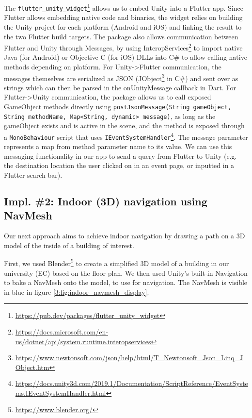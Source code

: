             The \texttt{flutter_unity_widget}\footnote{\url{https://pub.dev/packages/flutter_unity_widget}} allows us to embed Unity into a Flutter app. Since Flutter allows embedding native code and binaries, the widget relies on building the Unity project for each platform (Android and iOS) and linking the result to the two Flutter build targets.
            The package also allows communication between Flutter and Unity through Messages, by using InteropServices\footnote{\url{https://docs.microsoft.com/en-us/dotnet/api/system.runtime.interopservices}} to import native Java (for Android) or Objective-C (for iOS) DLLs into C# to allow calling native methods depending on platform. For Unity->Flutter communication, the messages themselves are serialized as JSON (JObject\footnote{\url{https://www.newtonsoft.com/json/help/html/T_Newtonsoft_Json_Linq_JObject.htm}} in C\#) and sent over as strings which can then be parsed in the onUnityMessage callback in Dart. For Flutter->Unity communication, the package allows us to call exposed GameObject methods directly using \texttt{postJsonMessage(String gameObject, String methodName, Map<String, dynamic> message)}, as long as the gameObject exists and is active in the scene, and the method is exposed through a \texttt{MonoBehaviour} script that uses \texttt{IEventSystemHandler}\footnote{\url{https://docs.unity3d.com/2019.1/Documentation/ScriptReference/EventSystems.IEventSystemHandler.html}}. The message parameter represents a map from method parameter name to its value. We can use this messaging functionality in our app to send a query from Flutter to Unity (e.g. the destination location the user clicked on in an event page, or inputted in a Flutter search bar).
    
    \subsection{Impl. \#2: Indoor (3D) navigation using NavMesh} \label{3:impl2}
    
        Our next approach aims to achieve indoor navigation by drawing a path on a 3D model of the inside of a building of interest.
        
        First, we used Blender\footnote{\url{https://www.blender.org/}} to create a simplified 3D model of a building in our university (EC) based on the floor plan. We then used Unity’s built-in Navigation to bake a NavMesh onto the model, to use for navigation. The NavMesh is visible in blue in figure \ref{3:fig:indoor_navmesh_display}.
        
